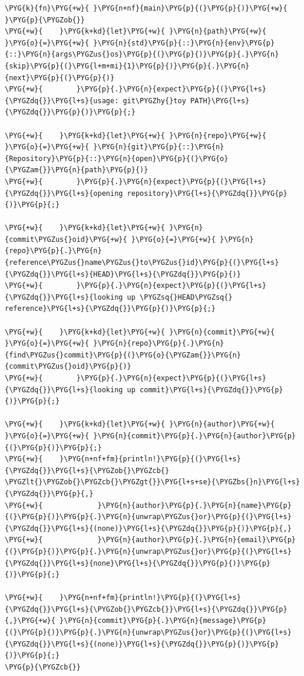 \begin{Verbatim}[commandchars=\\\{\},breaklines=true,breakanywhere=true,fontsize=\codefont,xleftmargin=17bp]
\PYG{k}{fn}\PYG{+w}{ }\PYG{n+nf}{main}\PYG{p}{(}\PYG{p}{)}\PYG{+w}{ }\PYG{p}{\PYGZob{}}
\PYG{+w}{    }\PYG{k+kd}{let}\PYG{+w}{ }\PYG{n}{path}\PYG{+w}{ }\PYG{o}{=}\PYG{+w}{ }\PYG{n}{std}\PYG{p}{::}\PYG{n}{env}\PYG{p}{::}\PYG{n}{args\PYGZus{}os}\PYG{p}{(}\PYG{p}{)}\PYG{p}{.}\PYG{n}{skip}\PYG{p}{(}\PYG{l+m+mi}{1}\PYG{p}{)}\PYG{p}{.}\PYG{n}{next}\PYG{p}{(}\PYG{p}{)}
\PYG{+w}{        }\PYG{p}{.}\PYG{n}{expect}\PYG{p}{(}\PYG{l+s}{\PYGZdq{}}\PYG{l+s}{usage: git\PYGZhy{}toy PATH}\PYG{l+s}{\PYGZdq{}}\PYG{p}{)}\PYG{p}{;}

\PYG{+w}{    }\PYG{k+kd}{let}\PYG{+w}{ }\PYG{n}{repo}\PYG{+w}{ }\PYG{o}{=}\PYG{+w}{ }\PYG{n}{git}\PYG{p}{::}\PYG{n}{Repository}\PYG{p}{::}\PYG{n}{open}\PYG{p}{(}\PYG{o}{\PYGZam{}}\PYG{n}{path}\PYG{p}{)}
\PYG{+w}{        }\PYG{p}{.}\PYG{n}{expect}\PYG{p}{(}\PYG{l+s}{\PYGZdq{}}\PYG{l+s}{opening repository}\PYG{l+s}{\PYGZdq{}}\PYG{p}{)}\PYG{p}{;}

\PYG{+w}{    }\PYG{k+kd}{let}\PYG{+w}{ }\PYG{n}{commit\PYGZus{}oid}\PYG{+w}{ }\PYG{o}{=}\PYG{+w}{ }\PYG{n}{repo}\PYG{p}{.}\PYG{n}{reference\PYGZus{}name\PYGZus{}to\PYGZus{}id}\PYG{p}{(}\PYG{l+s}{\PYGZdq{}}\PYG{l+s}{HEAD}\PYG{l+s}{\PYGZdq{}}\PYG{p}{)}
\PYG{+w}{        }\PYG{p}{.}\PYG{n}{expect}\PYG{p}{(}\PYG{l+s}{\PYGZdq{}}\PYG{l+s}{looking up \PYGZsq{}HEAD\PYGZsq{} reference}\PYG{l+s}{\PYGZdq{}}\PYG{p}{)}\PYG{p}{;}

\PYG{+w}{    }\PYG{k+kd}{let}\PYG{+w}{ }\PYG{n}{commit}\PYG{+w}{ }\PYG{o}{=}\PYG{+w}{ }\PYG{n}{repo}\PYG{p}{.}\PYG{n}{find\PYGZus{}commit}\PYG{p}{(}\PYG{o}{\PYGZam{}}\PYG{n}{commit\PYGZus{}oid}\PYG{p}{)}
\PYG{+w}{        }\PYG{p}{.}\PYG{n}{expect}\PYG{p}{(}\PYG{l+s}{\PYGZdq{}}\PYG{l+s}{looking up commit}\PYG{l+s}{\PYGZdq{}}\PYG{p}{)}\PYG{p}{;}

\PYG{+w}{    }\PYG{k+kd}{let}\PYG{+w}{ }\PYG{n}{author}\PYG{+w}{ }\PYG{o}{=}\PYG{+w}{ }\PYG{n}{commit}\PYG{p}{.}\PYG{n}{author}\PYG{p}{(}\PYG{p}{)}\PYG{p}{;}
\PYG{+w}{    }\PYG{n+nf+fm}{println!}\PYG{p}{(}\PYG{l+s}{\PYGZdq{}}\PYG{l+s}{\PYGZob{}\PYGZcb{} \PYGZlt{}\PYGZob{}\PYGZcb{}\PYGZgt{}}\PYG{l+s+se}{\PYGZbs{}n}\PYG{l+s}{\PYGZdq{}}\PYG{p}{,}
\PYG{+w}{             }\PYG{n}{author}\PYG{p}{.}\PYG{n}{name}\PYG{p}{(}\PYG{p}{)}\PYG{p}{.}\PYG{n}{unwrap\PYGZus{}or}\PYG{p}{(}\PYG{l+s}{\PYGZdq{}}\PYG{l+s}{(none)}\PYG{l+s}{\PYGZdq{}}\PYG{p}{)}\PYG{p}{,}
\PYG{+w}{             }\PYG{n}{author}\PYG{p}{.}\PYG{n}{email}\PYG{p}{(}\PYG{p}{)}\PYG{p}{.}\PYG{n}{unwrap\PYGZus{}or}\PYG{p}{(}\PYG{l+s}{\PYGZdq{}}\PYG{l+s}{none}\PYG{l+s}{\PYGZdq{}}\PYG{p}{)}\PYG{p}{)}\PYG{p}{;}

\PYG{+w}{    }\PYG{n+nf+fm}{println!}\PYG{p}{(}\PYG{l+s}{\PYGZdq{}}\PYG{l+s}{\PYGZob{}\PYGZcb{}}\PYG{l+s}{\PYGZdq{}}\PYG{p}{,}\PYG{+w}{ }\PYG{n}{commit}\PYG{p}{.}\PYG{n}{message}\PYG{p}{(}\PYG{p}{)}\PYG{p}{.}\PYG{n}{unwrap\PYGZus{}or}\PYG{p}{(}\PYG{l+s}{\PYGZdq{}}\PYG{l+s}{(none)}\PYG{l+s}{\PYGZdq{}}\PYG{p}{)}\PYG{p}{)}\PYG{p}{;}
\PYG{p}{\PYGZcb{}}
\end{Verbatim}

